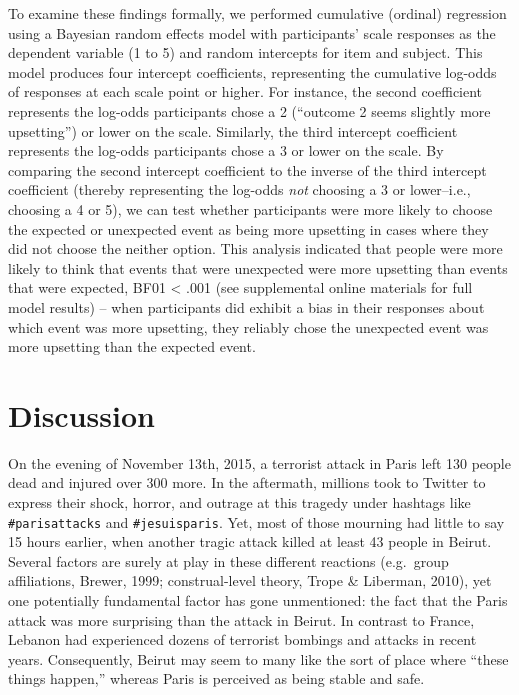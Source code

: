 \documentclass[12pt,]{article}
\begin{document}
To examine these findings formally, we performed cumulative (ordinal)
regression using a Bayesian random effects model with participants'
scale responses as the dependent variable (1 to 5) and random intercepts
for item and subject. This model produces four intercept coefficients,
representing the cumulative log-odds of responses at each scale point or
higher. For instance, the second coefficient represents the log-odds
participants chose a 2 (``outcome 2 seems slightly more upsetting'') or
lower on the scale. Similarly, the third intercept coefficient
represents the log-odds participants chose a 3 or lower on the scale. By
comparing the second intercept coefficient to the inverse of the third
intercept coefficient (thereby representing the log-odds \emph{not}
choosing a 3 or lower--i.e., choosing a 4 or 5), we can test whether
participants were more likely to choose the expected or unexpected event
as being more upsetting in cases where they did not choose the neither
option. This analysis indicated that people were more likely to think
that events that were unexpected were more upsetting than events that
were expected, BF01 \textless{} .001 (see supplemental online materials
for full model results) -- when participants did exhibit a bias in their
responses about which event was more upsetting, they reliably chose the
unexpected event was more upsetting than the expected event.

\section{Discussion}\label{discussion}

On the evening of November 13th, 2015, a terrorist attack in Paris left
130 people dead and injured over 300 more. In the aftermath, millions
took to Twitter to express their shock, horror, and outrage at this
tragedy under hashtags like \texttt{\#parisattacks} and
\texttt{\#jesuisparis}. Yet, most of those mourning had little to say 15
hours earlier, when another tragic attack killed at least 43 people in
Beirut. Several factors are surely at play in these different reactions
(e.g.~group affiliations, Brewer, 1999; construal-level theory, Trope \&
Liberman, 2010), yet one potentially fundamental factor has gone
unmentioned: the fact that the Paris attack was more surprising than the
attack in Beirut. In contrast to France, Lebanon had experienced dozens
of terrorist bombings and attacks in recent years. Consequently, Beirut
may seem to many like the sort of place where ``these things happen,''
whereas Paris is perceived as being stable and safe.
\end{document}
